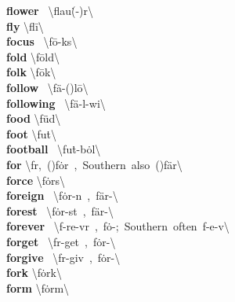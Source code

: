 \documentclass[10pt,a4paper]{article}
\begin{document}
\begin{multicols}{2}
\textbf{ flower }\quad \ \textbackslash \textprimstress flau\. (-\textschwa )r\textbackslash \\
\textbf{ fly }\quad \textbackslash \textprimstress fl\={i}\textbackslash \\
\textbf{ focus }\quad \ \textbackslash \textprimstress f\={o}-k\textschwa s\textbackslash \\
\textbf{ fold }\quad \textbackslash \textprimstress f\={o}ld\textbackslash \\
\textbf{ folk }\quad \textbackslash \textprimstress f\={o}k\textbackslash \\
\textbf{ follow }\quad \ \textbackslash \textprimstress f\"{a}-(\textsecstress )l\={o}\textbackslash \\
\textbf{ following }\quad \ \textbackslash \textprimstress f\"{a}-l\textschwa -wi\engma \textbackslash \\
\textbf{ food }\quad \textbackslash \textprimstress f\"{u}d\textbackslash \\
\textbf{ foot }\quad \textbackslash \textprimstress fu\. t\textbackslash \\
\textbf{ football }\quad \ \textbackslash \textprimstress fu\. t-\textsecstress b\.{o}l\textbackslash \\
\textbf{ for }\quad \textbackslash f\textschwa r,\ (\textprimstress )f\.{o}r\ ,\ Southern\ also\ (\textprimstress )f\"{a}r\textbackslash \\
\textbf{ force }\quad \textbackslash \textprimstress f\.{o}rs\textbackslash \\
\textbf{ foreign }\quad \ \textbackslash \textprimstress f\.{o}r-\textschwa n\ ,\ \textprimstress f\"{a}r-\textbackslash \\
\textbf{ forest }\quad \ \textbackslash \textprimstress f\.{o}r-\textschwa st\ ,\ \textprimstress f\"{a}r-\textbackslash \\
\textbf{ forever }\quad \ \textbackslash f\textschwa -\textprimstress re-v\textschwa r\ ,\ f\.{o}-;\ Southern\ often\ f\textschwa -\textprimstress e-v\textschwa \textbackslash \\
\textbf{ forget }\quad \ \textbackslash f\textschwa r-\textprimstress get\ ,\ f\.{o}r-\textbackslash \\
\textbf{ forgive }\quad \ \textbackslash f\textschwa r-\textprimstress giv\ ,\ f\.{o}r-\textbackslash \\
\textbf{ fork }\quad \textbackslash \textprimstress f\.{o}rk\textbackslash \\
\textbf{ form }\quad \textbackslash \textprimstress f\.{o}rm\textbackslash \\

\end{multicols}
\end{document}
